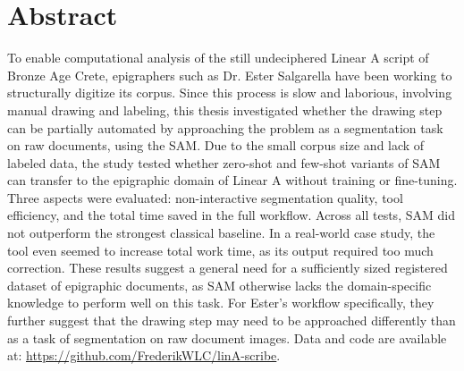 \chapter{Abstract}

To enable computational analysis of the still undeciphered Linear A script of Bronze Age Crete, epigraphers such as Dr. Ester Salgarella have been working to structurally digitize its corpus.
Since this process is slow and laborious, involving manual drawing and labeling, this thesis investigated whether the drawing step can be partially automated by approaching the problem as a segmentation task on raw documents, using the \acf{SAM}.
Due to the small corpus size and lack of labeled data, the study tested whether zero-shot and few-shot variants of \acs{SAM} can transfer to the epigraphic domain of Linear A without training or fine-tuning.
Three aspects were evaluated: non-interactive segmentation quality, tool efficiency, and the total time saved in the full workflow.
Across all tests, \acs{SAM} did not outperform the strongest classical baseline.
In a real-world case study, the tool even seemed to increase total work time, as its output required too much correction.
These results suggest a general need for a sufficiently sized registered dataset of epigraphic documents, as \acs{SAM} otherwise lacks the domain-specific knowledge to perform well on this task.
For Ester's workflow specifically, they further suggest that the drawing step may need to be approached differently than as a task of segmentation on raw document images.
Data and code are available at: \url{https://github.com/FrederikWLC/linA-scribe}.